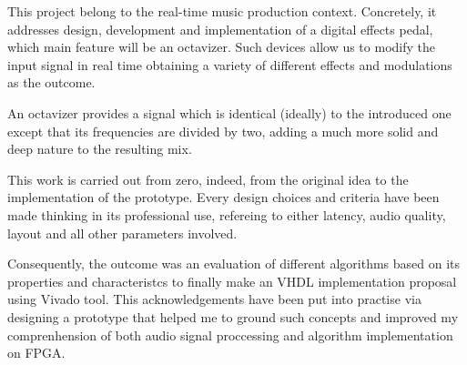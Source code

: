 This project belong to the real-time music production context. Concretely, it addresses design, development and implementation of a digital effects pedal, which main feature will be an octavizer. Such devices allow us to modify the input signal in real time obtaining a variety of different effects and modulations as the outcome.

An octavizer provides a signal which is identical (ideally) to the introduced one except that its frequencies are divided by two, adding a much more solid and deep nature to the resulting mix.

This work is carried out from zero, indeed, from the original idea to the implementation of the prototype. Every design choices and criteria have been made thinking in its professional use, refereing to either latency, audio quality, layout and all other parameters involved.

Consequently, the outcome was an evaluation of different algorithms based on its properties and characteristcs to finally make an VHDL implementation proposal using Vivado tool. This acknowledgements have been put into practise via designing a prototype that helped me to ground such concepts and improved my comprenhension of both audio signal proccessing and algorithm implementation on FPGA.
